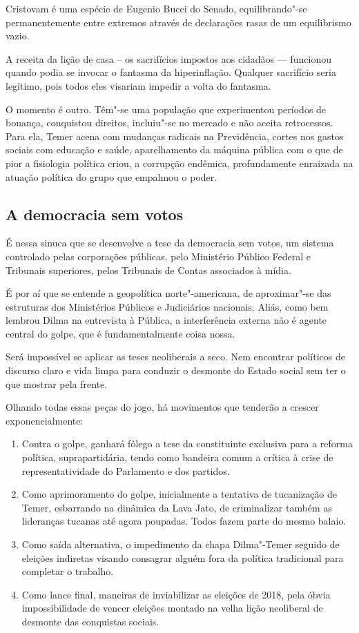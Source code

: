 Cristovam é uma espécie de Eugenio Bucci do Senado, equilibrando"-se
permanentemente entre extremos através de declarações rasas de um
equilibrismo vazio.

A receita da lição de casa -- os sacrifícios impostos aos cidadãos ---
funcionou quando podia se invocar o fantasma da hiperinflação. Qualquer
sacrifício seria legítimo, pois todos eles visariam impedir a volta do
fantasma.

O momento é outro. Têm"-se uma população que experimentou períodos de
bonança, conquistou direitos, incluiu"-se no mercado e não aceita
retrocessos. Para ela, Temer acena com mudanças radicais na Previdência,
cortes nos gastos sociais com educação e saúde, aparelhamento da máquina
pública com o que de pior a fisiologia política criou, a corrupção
endêmica, profundamente enraizada na atuação política do grupo que
empalmou o poder.

\subsection{A democracia sem votos}

É nessa sinuca que se desenvolve a tese da democracia sem votos, um
sistema controlado pelas corporações públicas, pelo Ministério Público
Federal e Tribunais superiores, pelos Tribunais de Contas associados à
mídia.

É por aí que se entende a geopolítica norte"-americana, de aproximar"-se
das estruturas dos Ministérios Públicos e Judiciários nacionais. Aliás,
como bem lembrou Dilma na entrevista à Pública, a interferência externa
não é agente central do golpe, que é fundamentalmente coisa nossa.

Será impossível se aplicar as teses neoliberais a seco. Nem encontrar
políticos de discurso claro e vida limpa para conduzir o desmonte do
Estado social sem ter o que mostrar pela frente.

Olhando todas essas peças do jogo, há movimentos que tenderão a crescer
exponencialmente:

\begin{enumerate}
\itemsep1pt\parskip0pt
\item
  Contra o golpe, ganhará fôlego a tese da constituinte exclusiva para a
  reforma política, suprapartidária, tendo como bandeira comum a crítica
  à crise de representatividade do Parlamento e dos partidos.
\item
  Como aprimoramento do golpe, inicialmente a tentativa de tucanização
  de Temer, esbarrando na dinâmica da Lava Jato, de criminalizar também
  as lideranças tucanas até agora poupadas. Todos fazem parte do mesmo
  balaio.
\item
  Como saída alternativa, o impedimento da chapa Dilma"-Temer seguido de
  eleições indiretas visando consagrar alguém fora da política
  tradicional para completar o trabalho.
\item
  Como lance final, maneiras de inviabilizar as eleições de 2018, pela
  óbvia impossibilidade de vencer eleições montado na velha lição
  neoliberal de desmonte das conquistas sociais.
\end{enumerate}
